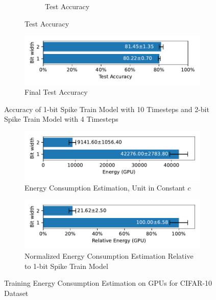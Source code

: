 \begin{figure}[H]
\begin{subfigure}[H]{\textwidth}
\begin{subfigure}[H]{\textwidth}
                    \caption{Test Accuracy}
                \end{subfigure}
            \end{subfigure}
            \hfill
            \begin{subfigure}[H]{0.8\textwidth}
                \centering
                \includegraphics[width=\textwidth]{../timesteps/CIFAR10/plots/cifar10_final_acc_horizontal.pdf}
                \caption{Final Test Accuracy}
            \end{subfigure}
            \caption{Accuracy of 1-bit Spike Train Model with 10 Timesteps and 2-bit Spike Train Model with 4 Timesteps}
        \end{figure}

        \begin{figure}[H]
            \centering
            \begin{subfigure}[H]{\textwidth}
                \includegraphics[width=\textwidth]{../timesteps/CIFAR10/plots/cifar10_train_energy_gpu_horizontal.pdf}
                \caption{Energy Consumption Estimation, Unit in Constant $c$}
            \end{subfigure}
            \hfill
            \begin{subfigure}[H]{\textwidth}
                \includegraphics[width=\textwidth]{../timesteps/CIFAR10/plots/cifar10_train_relative_energy_gpu_horizontal.pdf}
                \caption{Normalized Energy Consumption Estimation Relative to 1-bit Spike Train Model}
            \end{subfigure}
            \caption{Training Energy Consumption Estimation on GPUs for CIFAR-10 Dataset}
        \end{figure}

